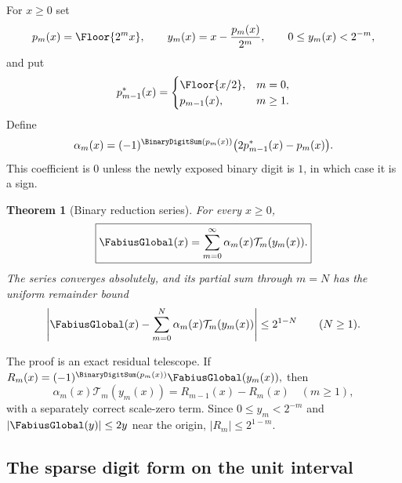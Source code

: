 \documentclass[11pt,oneside]{article}
\newtheorem{theorem}{Theorem}[section]
\theoremstyle{definition}
\theoremstyle{remark}
\begin{document}
For $x\ge0$ set
\begin{equation}
 p_m(x)=\Floor{2^mx},
 \qquad
 y_m(x)=x-\frac{p_m(x)}{2^m},
 \qquad 0\le y_m(x)<2^{-m},                               \label{dyadicweb:eq:prefix-tail-local}
\end{equation}
and put
\begin{equation}
 p^*_{m-1}(x)=
 \begin{cases}
 \Floor{x/2},&m=0,\\
 p_{m-1}(x),&m\ge1.
 \end{cases}                                               \label{dyadicweb:eq:previous-prefix-local}
\end{equation}
Define
\begin{equation}
 \alpha_m(x)=(-1)^{\BinaryDigitSum(p_m(x))}
 \bigl(2p^*_{m-1}(x)-p_m(x)\bigr).                         \label{dyadicweb:eq:alpha-local}
\end{equation}
This coefficient is $0$ unless the newly exposed binary digit is $1$, in which case it is a
sign.

\begin{theorem}[Binary reduction series]
\label{dyadicweb:thm:binary-series-local}
For every $x\ge0$,
\begin{equation}
 \boxed{
 \FabiusGlobal(x)=\sum_{m=0}^{\infty}
 \alpha_m(x)\mathcal T_m(y_m(x)).}                        \label{dyadicweb:eq:binary-series-local}
\end{equation}
The series converges absolutely, and its partial sum through $m=N$ has the uniform remainder
bound
\begin{equation}
 \left|\FabiusGlobal(x)-\sum_{m=0}^{N}
 \alpha_m(x)\mathcal T_m(y_m(x))\right|\le2^{1-N}
 \qquad(N\ge1).                                           \label{dyadicweb:eq:binary-tail-local}
\end{equation}
\end{theorem}

The proof is an exact residual telescope.  If
\(
 R_m(x)=(-1)^{\BinaryDigitSum(p_m(x))}\FabiusGlobal(y_m(x)),
\)
then
\[
 \alpha_m(x)\mathcal T_m(y_m(x))=R_{m-1}(x)-R_m(x)
 \quad(m\ge1),
\]
with a separately correct scale-zero term.  Since $0\le y_m<2^{-m}$ and
$|\FabiusGlobal(y)|\le2y$ near the origin, $|R_m|\le2^{1-m}$.

\subsection{The sparse digit form on the unit interval}
\end{document}
